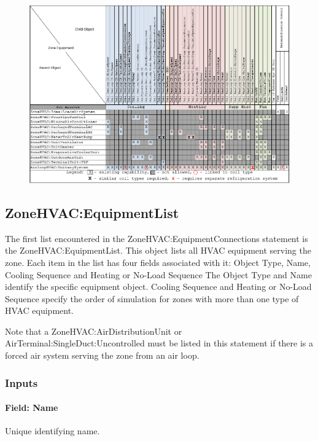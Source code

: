 \begin{figure}[htbp]
\centering
\includegraphics{media/ZoneComponentMatrix.png}
\caption{}
\end{figure}

\subsection{ZoneHVAC:EquipmentList}\label{zonehvacequipmentlist}

The first list encountered in the ZoneHVAC:EquipmentConnections statement is the ZoneHVAC:EquipmentList. This object lists all HVAC equipment serving the zone. Each item in the list has four fields associated with it: Object Type, Name, Cooling Sequence and Heating or No-Load Sequence The Object Type and Name identify the specific equipment object. Cooling Sequence and Heating or No-Load Sequence specify the order of simulation for zones with more than one type of HVAC equipment.

Note that a ZoneHVAC:AirDistributionUnit or AirTerminal:SingleDuct:Uncontrolled must be listed in this statement if there is a forced air system serving the zone from an air loop.

\subsubsection{Inputs}\label{inputs-2-048}

\paragraph{Field: Name}\label{field-name-1-050}

Unique identifying name.

